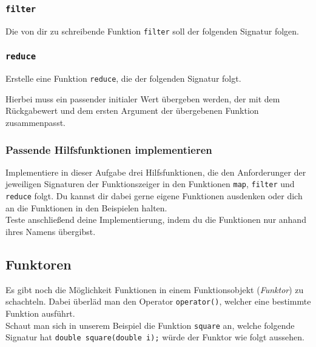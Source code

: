 \subsubsection{\lstinline{filter}}

Die von dir zu schreibende Funktion \lstinline{filter} soll der folgenden Signatur folgen.



\subsubsection{\lstinline{reduce}}

Erstelle eine Funktion \lstinline{reduce}, die der folgenden Signatur folgt.



Hierbei muss ein passender initialer Wert übergeben werden, der mit dem Rückgabewert und dem ersten Argument der übergebenen Funktion zusammenpasst.

\subsubsection{Passende Hilfsfunktionen implementieren}
Implementiere in dieser Aufgabe drei Hilfsfunktionen, die den Anforderunger der jeweiligen Signaturen der Funktionszeiger in den Funktionen \lstinline{map}, \lstinline{filter} und \lstinline{reduce} folgt.
Du kannst dir dabei gerne eigene Funktionen ausdenken oder dich an die Funktionen in den Beispielen halten. \\

Teste anschließend deine Implementierung, indem du die Funktionen nur anhand ihres Namens übergibst.

\subsection{Funktoren}
\label{sec:functional_functor}
Es gibt noch die Möglichkeit Funktionen in einem Funktionsobjekt (\emph{Funktor}) zu schachteln.
Dabei überläd man den Operator \lstinline{operator()}, welcher eine bestimmte Funktion ausführt. \\

Schaut man sich in unserem Beispiel die Funktion \lstinline{square} an, welche folgende Signatur hat \lstinline{double square(double i);} würde der Funktor wie folgt aussehen.




